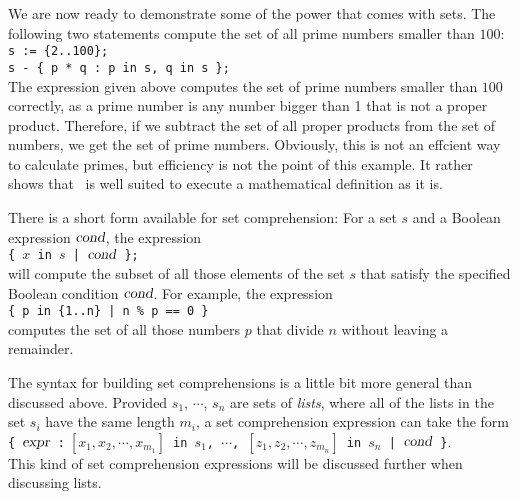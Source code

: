 We are now ready to demonstrate some of the power that comes with sets.  
The following two statements compute the set of all prime numbers smaller than $100$:
\\[0.2cm]
\hspace*{1.3cm}
\texttt{s := \{2..100\};}
\\
\hspace*{1.3cm}
\texttt{s - \{ p * q : p in s, q in s \};}
\\[0.2cm]
The expression given above computes the set of prime numbers smaller
than $100$ correctly, as a prime number
is any number bigger than 1 that is not a proper product.  Therefore, if we subtract the
set of all proper products from the set of numbers, we get the set of prime numbers.
Obviously, this is not an effcient way to calculate primes, but efficiency is not the
point of this example.  It rather shows that \setlx\ is well suited to execute a
mathematical definition as it is.

There is a short form available for set comprehension:  For a set $s$ and a Boolean expression
$\textsl{cond}$, the expression
\\[0.2cm]
\hspace*{1.3cm}
\texttt{\{ $x$ in $s$ | $\textsl{cond}$ \};}
\\[0.2cm]
will compute the subset of all those elements of the set $s$ that satisfy the specified Boolean
condition $\textsl{cond}$.  For example, the expression
\\[0.2cm]
\hspace*{1.3cm}
\texttt{\{ p in \{1..n\} | n \% p == 0 \}}
\\[0.2cm]
computes the set of all those numbers $p$ that divide $n$ without leaving a remainder.

The syntax for building set comprehensions is a little bit more
general than discussed above.  Provided $s_1$, $\cdots$, $s_n$ are sets of \emph{lists},
where all of the lists in the set $s_i$ have the same length $m_i$, a set comprehension expression
can take the form
\\[0.2cm]
\hspace*{1.3cm}
\texttt{\{ $\textsl{expr}$ :$\;[x_1,x_2,\cdots,x_{m_1}]$ in $s_1$, $\cdots$, $[z_1,z_2,\cdots, z_{m_n}]$ in $s_n$ | $\textsl{cond}$ \}}.
\\[0.2cm]
This kind of set comprehension expressions will be discussed further when discussing lists.


